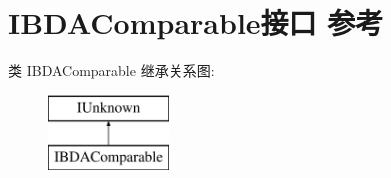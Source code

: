 \hypertarget{interface_i_b_d_a_comparable}{}\section{I\+B\+D\+A\+Comparable接口 参考}
\label{interface_i_b_d_a_comparable}
类 I\+B\+D\+A\+Comparable 继承关系图\+:\begin{figure}[H]
\begin{center}
\leavevmode
\includegraphics[height=2.000000cm]{interface_i_b_d_a_comparable}
\end{center}
\end{figure}
